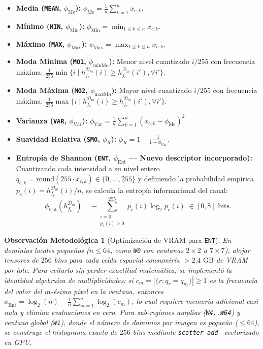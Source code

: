 \documentclass[10pt,a4paper,twocolumn]{article}
\newtheorem{remark}{Observación Metodológica}
\begin{document}
\begin{itemize}[leftmargin=*,nosep]
  \item \textbf{Media (\texttt{MEAN}, $\phi_{\text{Me}}$):} $\displaystyle \phi_{\text{Me}} = \frac{1}{n} \sum_{k=1}^{n} x_{c,k}$.
  \item \textbf{Mínimo (\texttt{MIN}, $\phi_{\text{Min}}$):} $\displaystyle \phi_{\text{Min}} = \min_{1 \le k \le n} x_{c,k}$.
  \item \textbf{Máximo (\texttt{MAX}, $\phi_{\text{Max}}$):} $\displaystyle \phi_{\text{Max}} = \max_{1 \le k \le n} x_{c,k}$.
  \item \textbf{Moda Mínima (\texttt{MO1}, $\phi_{\text{minMo}}$):} Menor nivel cuantizado $i/255$ con frecuencia máxima: $\frac{1}{255}\min\{i \mid h^{\mathcal{D}_m}_{f_c}(i) \ge h^{\mathcal{D}_m}_{f_c}(i'), \forall i'\}$.
  \item \textbf{Moda Máxima (\texttt{MO2}, $\phi_{\text{maxMo}}$):} Mayor nivel cuantizado $i/255$ con frecuencia máxima: $\frac{1}{255}\max\{i \mid h^{\mathcal{D}_m}_{f_c}(i) \ge h^{\mathcal{D}_m}_{f_c}(i'), \forall i'\}$.
  \item \textbf{Varianza (\texttt{VAR}, $\phi_{\text{Var}}$):} $\displaystyle \phi_{\text{Var}} = \frac{1}{n} \sum_{k=1}^{n} (x_{c,k} - \phi_{\text{Me}})^2$.
  \item \textbf{Suavidad Relativa (\texttt{SMO}, $\phi_R$):} $\displaystyle \phi_R = 1 - \frac{1}{1 + \phi_{\text{Var}}}$.
  \item \textbf{Entropía de Shannon (\texttt{ENT}, $\phi_{\text{Ent}}$ — Nuevo descriptor incorporado):} Cuantizando cada intensidad a su nivel entero $q_{c,k} = \text{round}(255 \cdot x_{c,k}) \in \{0, \dots, 255\}$ y definiendo la probabilidad empírica $p_c(i) = h^{\mathcal{D}_m}_{f_c}(i) / n$, se calcula la entropía informacional del canal:
  \begin{equation}
    \phi_{\text{Ent}}\!\left(h^{\mathcal{D}_m}_{f_c}\right) = - \sum_{\substack{i=0 \\ p_c(i) > 0}}^{255} p_c(i) \log_2 p_c(i) \;\in [0, 8]\text{ bits}.
    \label{eq:entropy}
  \end{equation}
\end{itemize}

\begin{remark}[Optimización de VRAM para \texttt{ENT}]
  En dominios locales pequeños ($n \le 64$, como \texttt{W0} con ventanas $2\times2$ a $7\times7$), alojar tensores de $256$ bins para cada celda espacial consumiría $>2.4\text{ GB}$ de VRAM por lote. Para evitarlo sin perder exactitud matemática, se implementó la identidad algebraica de multiplicidades: si $c_m = |\{r : q_r = q_m\}| \ge 1$ es la frecuencia del valor del $m$-ésimo píxel en la ventana, entonces $\phi_{\text{Ent}} = \log_2(n) - \frac{1}{n}\sum_{m=1}^{n} \log_2(c_m)$, lo cual requiere memoria adicional casi nula y elimina evaluaciones en cero. Para sub-regiones amplias (\texttt{W4..W64}) y ventana global (\texttt{W1}), donde el número de dominios por imagen es pequeño ($\le 64$), se construye el histograma exacto de $256$ bins mediante \texttt{scatter\_add\_} vectorizado en GPU.
\end{remark}
\end{document}
